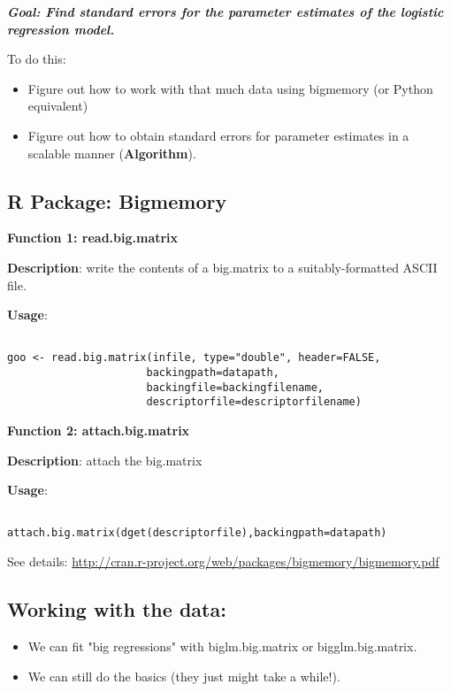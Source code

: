 \documentclass[11pt]{article}
\begin{document}
\emph{\textbf{Goal: Find standard errors for the parameter estimates of the logistic regression model.}}

To do this:
\begin{itemize}
  \item Figure out how to work with that much data using bigmemory (or Python equivalent)
  \item Figure out how to obtain standard errors for parameter estimates in a scalable manner (\textbf{Algorithm}).
\end{itemize}
\subsection{R Package: Bigmemory}
\textbf{Function 1: read.big.matrix}

\textbf{Description}: write the contents of a big.matrix to a suitably-formatted ASCII file.


\textbf{Usage}:
\begin{lstlisting}[frame=single]  % Start your code-block

goo <- read.big.matrix(infile, type="double", header=FALSE,
                      backingpath=datapath,
                      backingfile=backingfilename,
                      descriptorfile=descriptorfilename)

\end{lstlisting}


\textbf{Function 2: attach.big.matrix}

\textbf{Description}: attach the big.matrix

\textbf{Usage}:
\begin{lstlisting}[frame=single]  % Start your code-block

attach.big.matrix(dget(descriptorfile),backingpath=datapath)

\end{lstlisting}
See details: \href{http://cran.r-project.org/web/packages/bigmemory/bigmemory.pdf}{http://cran.r-project.org/web/packages/bigmemory/bigmemory.pdf}

\subsection{Working with the data:}
\begin{itemize}
  \item We can fit "big regressions" with biglm.big.matrix or bigglm.big.matrix.
  \item We can still do the basics (they just might take a while!).
\end{itemize}
\end{document}
